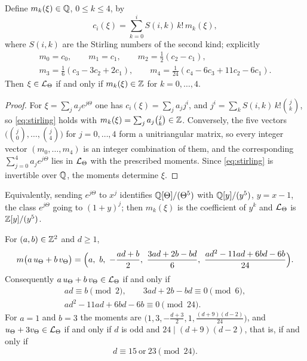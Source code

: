 \begin{lemma}\label{lem:binomialmoments}
Define $m_{k}(\xi)\in\mathbb{Q}$, $0\le k\le4$, by
\begin{equation}\label{eq:stirling}
  c_{i}(\xi)=\sum_{k=0}^{i}S(i,k)\,k!\,m_{k}(\xi),
\end{equation}
where $S(i,k)$ are the Stirling numbers of the second kind; explicitly
\begin{gather*}
  m_{0}=c_{0},\qquad m_{1}=c_{1},\qquad m_{2}=\tfrac12(c_{2}-c_{1}),\\
  m_{3}=\tfrac16(c_{3}-3c_{2}+2c_{1}),\qquad
  m_{4}=\tfrac1{24}(c_{4}-6c_{3}+11c_{2}-6c_{1}).
\end{gather*}
Then $\xi\in\mathcal{L}_{\Theta}$ if and only if $m_{k}(\xi)\in\mathbb{Z}$ for $k=0,\dots,4$.
\end{lemma}

\begin{proof}
For $\xi=\sum_{j}a_{j}e^{j\Theta}$ one has $c_{i}(\xi)=\sum_{j}a_{j}j^{i}$,
and $j^{i}=\sum_{k}S(i,k)\,k!\binom{j}{k}$, so \eqref{eq:stirling} holds
with $m_{k}(\xi)=\sum_{j}a_{j}\binom{j}{k}\in\mathbb{Z}$. Conversely, the five
vectors $\bigl(\binom{j}{0},\dots,\binom{j}{4}\bigr)$ for $j=0,\dots,4$
form a unitriangular matrix, so every integer vector $(m_{0},\dots,m_{4})$
is an integer combination of them, and the corresponding
$\sum_{j=0}^{4}a_{j}e^{j\Theta}$ lies in $\mathcal{L}_{\Theta}$ with the prescribed
moments. Since \eqref{eq:stirling} is invertible over $\mathbb{Q}$, the moments
determine $\xi$.
\end{proof}

Equivalently, sending $e^{j\Theta}$ to $x^{j}$ identifies
$\mathbb{Q}[\Theta]/(\Theta^{5})$ with $\mathbb{Q}[y]/(y^{5})$, $y=x-1$, the class
$e^{j\Theta}$ going to $(1+y)^{j}$; then $m_{k}(\xi)$ is the coefficient of
$y^{k}$ and $\mathcal{L}_{\Theta}$ is $\mathbb{Z}[y]/(y^{5})$.

\begin{theorem}
\label{thm:lattice}
For $(a,b)\in\mathbb{Z}^{2}$ and $d\ge1$,
\[
  m\bigl(a\,u_{\Theta}+b\,v_{\Theta}\bigr)
  =\Bigl(a,\ b,\ -\frac{ad+b}{2},\ \frac{3ad+2b-bd}{6},\
  \frac{ad^{2}-11ad+6bd-6b}{24}\Bigr).
\]
Consequently $a\,u_{\Theta}+b\,v_{\Theta}\in\mathcal{L}_{\Theta}$ if and only if
\begin{gather*}
  ad\equiv b\pmod 2,\qquad 3ad+2b-bd\equiv0\pmod 6,\\
  ad^{2}-11ad+6bd-6b\equiv0\pmod{24}.
\end{gather*}
For $a=1$ and $b=3$ the moments are
$\bigl(1,3,-\tfrac{d+3}{2},1,\tfrac{(d+9)(d-2)}{24}\bigr)$, and
$u_{\Theta}+3v_{\Theta}\in\mathcal{L}_{\Theta}$ if and only if $d$ is odd and
$24\mid(d+9)(d-2)$, that is, if and only if
\[
  d\equiv15\ \text{or}\ 23\pmod{24}.
\]
\end{theorem}

